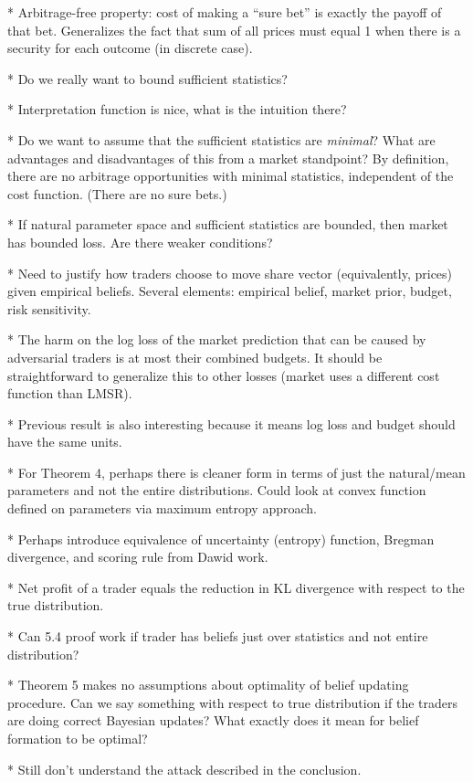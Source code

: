 \documentclass[11pt,letterpaper]{article}
\begin{document}
* Arbitrage-free property: cost of making a ``sure bet'' is exactly the payoff of that bet. Generalizes the fact that sum of all prices must equal 1 when there is a security for each outcome (in discrete case).

* Do we really want to bound sufficient statistics?

* Interpretation function is nice, what is the intuition there?

* Do we want to assume that the sufficient statistics are \emph{minimal}? What are advantages and disadvantages of this from a market standpoint? By definition, there are no arbitrage opportunities with minimal statistics, independent of the cost function. (There are no sure bets.) 

* If natural parameter space and sufficient statistics are bounded, then market has bounded loss. Are there weaker conditions?

* Need to justify how traders choose to move share vector (equivalently, prices) given empirical beliefs. Several elements: empirical belief, market prior, budget, risk sensitivity.

* The harm on the log loss of the market prediction that can be caused by adversarial traders is at most their combined budgets. It should be straightforward to generalize this to other losses (market uses a different cost function than LMSR).

* Previous result is also interesting because it means log loss and budget should have the same units.

* For Theorem 4, perhaps there is cleaner form in terms of just the natural/mean parameters and not the entire distributions. Could look at convex function defined on parameters via maximum entropy approach.

* Perhaps introduce equivalence of uncertainty (entropy) function, Bregman divergence, and scoring rule from Dawid work.

* Net profit of a trader equals the reduction in KL divergence with respect to the true distribution.

* Can 5.4 proof work if trader has beliefs just over statistics and not entire distribution?

* Theorem 5 makes no assumptions about optimality of belief updating procedure. Can we say something with respect to true distribution if the traders are doing correct Bayesian updates? What exactly does it mean for belief formation to be optimal?

* Still don't understand the attack described in the conclusion.
\end{document}
